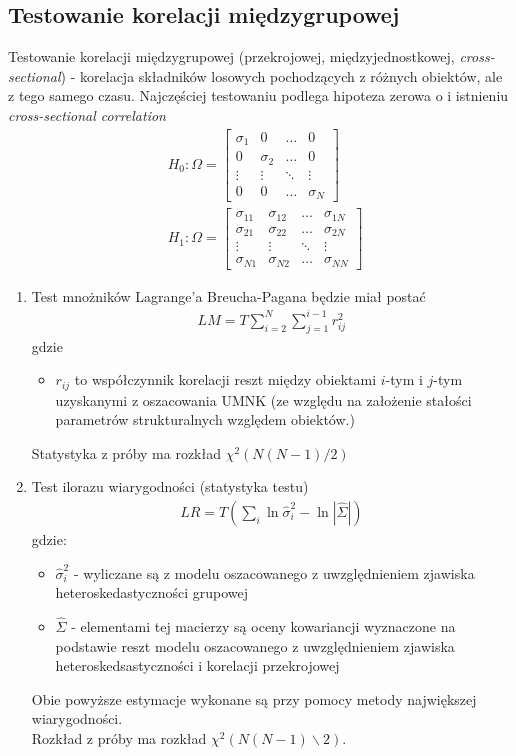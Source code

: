 \subsection{Testowanie korelacji międzygrupowej}
Testowanie korelacji międzygrupowej (przekrojowej, międzyjednostkowej, \emph{cross-sectional}) - korelacja składników losowych pochodzących z różnych obiektów, ale z tego samego czasu. Najczęściej testowaniu podlega hipoteza zerowa o i istnieniu \emph{cross-sectional correlation}
\begin{align*}
&H_0:\Omega=
\begin{bmatrix}
	\sigma _1 & 0         & \ldots & 0         \\
	0         & \sigma _2 & \ldots & 0         \\
	\vdots    & \vdots    & \ddots & \vdots    \\
	0         & 0         & \ldots & \sigma _N
\end{bmatrix}\\
&H_1:\Omega=
\begin{bmatrix}
	\sigma _{11} & \sigma _{12} & \ldots & \sigma _{1N} \\
	\sigma _{21} & \sigma _{22} & \ldots & \sigma _{2N} \\
	\vdots       & \vdots       & \ddots & \vdots       \\
	\sigma _{N1} & \sigma _{N2} & \ldots & \sigma _{NN}
\end{bmatrix}
\end{align*}
\begin{enumerate}
\item Test mnożników Lagrange'a Breucha-Pagana będzie miał postać
\begin{gather*}
LM=T\sum_{i=2}^{N}\sum_{j=1}^{i-1}r_{ij}^2
\end{gather*}
gdzie
\begin{itemize}
\item $ r_{ij} $ to współczynnik korelacji reszt między obiektami $ i $-tym i $ j $-tym uzyskanymi z oszacowania UMNK (ze względu na założenie stałości parametrów strukturalnych względem obiektów.)
\end{itemize}
Statystyka z próby ma rozkład $ \chi ^2(N(N-1)/2) $
\item Test ilorazu wiarygodności (statystyka testu)
\begin{gather*}
LR=T\left(\sum_i \ln \hat \sigma_i^2-\ln \left|\hat \Sigma\right|\right)
\end{gather*}
gdzie:
\begin{itemize}
\item $ \hat \sigma_i^2 $ - wyliczane są z modelu oszacowanego z uwzględnieniem zjawiska heteroskedastyczności grupowej
\item $ \hat \Sigma $ - elementami tej macierzy są oceny kowariancji wyznaczone na podstawie reszt modelu oszacowanego z uwzględnieniem zjawiska heteroskedsastyczności i korelacji przekrojowej
\end{itemize}
Obie powyższe estymacje wykonane są przy pomocy metody największej wiarygodności.\\
Rozkład z próby ma rozkład $ \chi^2(N(N-1)\backslash2) $.
\end{enumerate}
